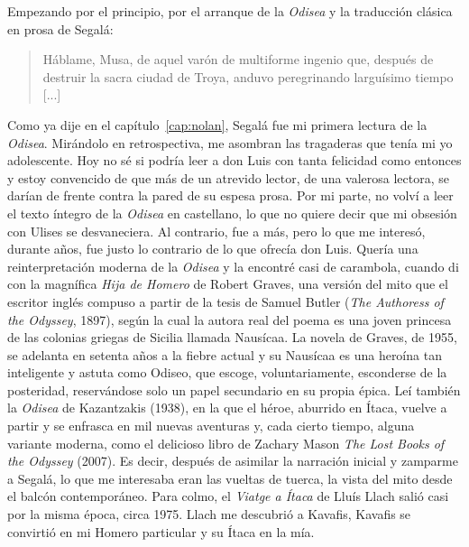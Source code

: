 Empezando por el principio, por el arranque de la \emph{Odisea} y la traducción clásica en prosa de Segalá:

\begin{quotation}
Háblame, Musa, de aquel varón de multiforme ingenio que, después de destruir la sacra ciudad de Troya, anduvo peregrinando larguísimo tiempo [...]
\end{quotation}

Como ya dije en el capítulo~\ref{cap:nolan}, Segalá fue mi primera lectura de la \emph{Odisea}. Mirándolo en retrospectiva, me asombran las tragaderas que tenía mi yo adolescente. Hoy no sé si podría leer a don Luis con tanta felicidad como entonces y estoy convencido de que más de un atrevido lector, de una valerosa lectora, se darían de frente contra la pared de su espesa prosa. Por mi parte, no volví a leer el texto íntegro de la \emph{Odisea} en castellano, lo que no quiere decir que mi obsesión con Ulises se desvaneciera. Al contrario, fue a más, pero lo que me interesó, durante años, fue justo lo contrario de lo que ofrecía don Luis. Quería una reinterpretación moderna de la \emph{Odisea} y la encontré casi de carambola, cuando di con la magnífica \emph{Hija de Homero} de Robert Graves, una versión del mito que el escritor inglés compuso a partir de la tesis de Samuel Butler (\emph{The Authoress of the Odyssey}, 1897), según la cual la autora real del poema es una joven princesa de las colonias griegas de Sicilia llamada Nausícaa. La novela de Graves, de 1955, se adelanta en setenta años a la fiebre actual y su Nausícaa es una heroína tan inteligente y astuta como Odiseo, que escoge, voluntariamente, esconderse de la posteridad, reservándose solo un papel secundario en su propia épica. Leí también la \emph{Odisea} de Kazantzakis (1938), en la que el héroe, aburrido en Ítaca, vuelve a partir y se enfrasca en mil nuevas aventuras y, cada cierto tiempo, alguna variante moderna, como el delicioso libro de Zachary Mason \emph{The Lost Books of the Odyssey} (2007). Es decir, después de asimilar la narración inicial y zamparme a Segalá, lo que me interesaba eran las vueltas de tuerca, la vista del mito desde el balcón contemporáneo. Para colmo, el \emph{Viatge a Ítaca} de Lluís Llach salió casi por la misma época, circa 1975. Llach me descubrió a Kavafis, Kavafis se convirtió en mi Homero particular y su Ítaca en la mía.

